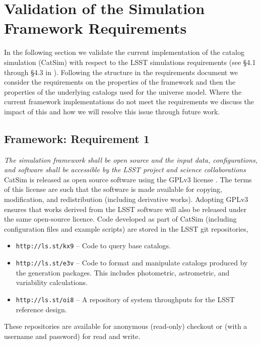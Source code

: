 \documentclass[11pt]{article}
\begin{document}
\section{Validation of the Simulation Framework Requirements}

In the following section we validate the current implementation of the
catalog simulation (CatSim) with respect to the LSST simulations
requirements (see \S 4.1 through \S 4.3 in
\citealt{requirements}). Following the structure in the requirements
document we consider the requirements on the properties of the
framework and then the properties of the underlying catalogs used for
the universe model.  Where the current framework implementations do
not meet the requirements we discuss the impact of this and how we
will resolve this issue through future work.

\subsection{Framework: Requirement 1}

{\it  The simulation framework shall be open source and the input data, configurations,
and software shall be accessible by the LSST project and science
collaborations}\\

CatSim is released as open source software using the GPLv3 license
\citep{gpl}. The terms of this license are such that the software is
made available for copying, modification, and redistribution
(including derivative works). Adopting GPLv3 ensures that works
derived from the LSST software will also be released under the same
open-source licence. Code developed as part of CatSim (including
configuration files and example scripts) are stored in the LSST 
git repositories,

\begin{itemize}
\item {\tt http://ls.st/kx9} -- Code to query
base catalogs.
\item {\tt http://ls.st/e3v} -- Code to format
and manipulate catalogs produced by the generation packages.  This includes photometric, 
astrometric, and variability calculations.
\item {\tt http://ls.st/oi8}
  -- A repository
of system throughputs for the LSST reference design.
\end{itemize}

These repositories are available for anonymous (read-only) checkout or
(with a username and password) for read and write.
\end{document}
